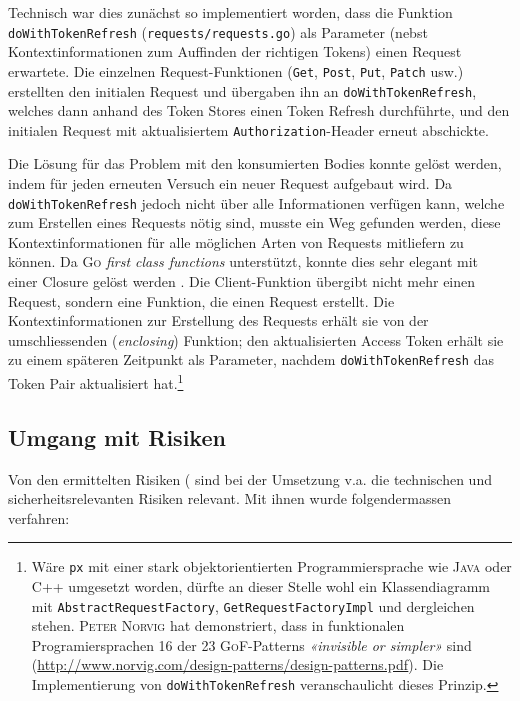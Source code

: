 Technisch war dies zunächst so implementiert worden, dass die Funktion \texttt{doWithToken\-Refresh} (\texttt{requests/requests.go}) als Parameter (nebst Kontextinformationen zum Auffinden der richtigen Tokens) einen Request erwartete. Die einzelnen Request-Funktionen (\texttt{Get}, \texttt{Post}, \texttt{Put}, \texttt{Patch} usw.) erstellten den initialen Request und übergaben ihn an \texttt{doWith\-Token\-Refresh}, welches dann anhand des Token Stores einen Token Refresh durchführte, und den initialen Request mit aktualisiertem \texttt{Authorization}-Header erneut abschickte.

Die Lösung für das Problem mit den konsumierten Bodies konnte gelöst werden, indem für jeden erneuten Versuch ein neuer Request aufgebaut wird. Da \texttt{doWithTokenRefresh} jedoch nicht über alle Informationen verfügen kann, welche zum Erstellen eines Requests nötig sind, musste ein Weg gefunden werden, diese Kontextinformationen für alle möglichen Arten von Requests mitliefern zu können. Da \textsc{Go} \textit{first class functions} unterstützt, konnte dies sehr elegant mit einer Closure gelöst werden \cite[S. 136]{gopl}. Die Client-Funktion übergibt nicht mehr einen Request, sondern eine Funktion, die einen Request erstellt. Die Kontextinformationen zur Erstellung des Requests erhält sie von der umschliessenden (\textit{enclosing}) Funktion; den aktualisierten Access Token erhält sie zu einem späteren Zeitpunkt als Parameter, nachdem \texttt{doWithTokenRefresh} das Token Pair aktualisiert hat.\footnote{Wäre \texttt{px} mit einer stark objektorientierten Programmiersprache wie \textsc{Java} oder \textsc{C++} umgesetzt worden, dürfte an dieser Stelle wohl ein Klassendiagramm mit \texttt{AbstractRequestFactory}, \texttt{GetRequestFactoryImpl} und dergleichen stehen. \textsc{Peter Norvig} hat demonstriert, dass in funktionalen Programiersprachen 16 der 23 \textsc{GoF}-Patterns \textit{«invisible or simpler»} sind (\url{http://www.norvig.com/design-patterns/design-patterns.pdf}). Die Implementierung von \texttt{doWithTokenRefresh} veranschaulicht dieses Prinzip.}

\subsection{Umgang mit Risiken}

Von den ermittelten Risiken ( sind bei der Umsetzung v.a. die technischen und sicherheitsrelevanten Risiken relevant. Mit ihnen wurde folgendermassen verfahren:

